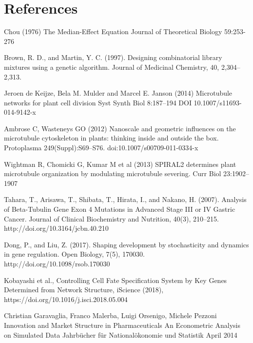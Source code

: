 \section{References}

Chou (1976)
\newblock The Median-Effect Equation
\newblock Journal of Theoretical Biology 59:253-276 

Brown, R. D., and Martin, Y. C. (1997). 
\newblock Designing combinatorial library mixtures using a genetic algorithm. 
\newblock Journal of Medicinal Chemistry, 40, 2,304–2,313.

Jeroen de Keijze, Bela M. Mulder and Marcel E. Janson (2014)
\newblock Microtubule networks for plant cell division
\newblock Syst Synth Biol 8:187–194 DOI 10.1007/s11693-014-9142-x

 Ambrose   C,   Wasteneys   GO   (2012)   
\newblock Nanoscale  and  geometric influences  on  the  microtubule  cytoskeleton  in  plants:  thinking inside  and  outside  the  box.  
\newblock Protoplasma  249(Suppl):S69–S76. doi:10.1007/s00709-011-0334-x

 Wightman   R,   Chomicki   G,   Kumar   M   et   al   (2013)   
\newblock SPIRAL2 determines plant microtubule organization by modulating microtubule severing. 
\newblock Curr Biol 23:1902–1907

Tahara, T., Arisawa, T., Shibata, T., Hirata, I., and Nakano, H. (2007). 
\newblock Analysis of Beta-Tubulin Gene Exon 4 Mutations in Advanced Stage III or IV Gastric Cancer. 
\newblock Journal of Clinical Biochemistry and Nutrition, 40(3), 210–215. http://doi.org/10.3164/jcbn.40.210

Dong, P., and Liu, Z. (2017). 
\newblock Shaping development by stochasticity and dynamics in gene regulation. 
\newblock Open Biology, 7(5), 170030. http://doi.org/10.1098/rsob.170030

Kobayashi et al., 
\newblock Controlling Cell Fate Specification System by Key Genes Determined from Network Structure,
\newblock iScience (2018), https://doi.org/10.1016/j.isci.2018.05.004

 Christian Garavaglia, Franco Malerba, Luigi Orsenigo, Michele Pezzoni
\newblock Innovation and Market Structure in Pharmaceuticals An Econometric Analysis on Simulated Data
\newblock Jahrbücher für Nationalökonomie und Statistik  April 2014

